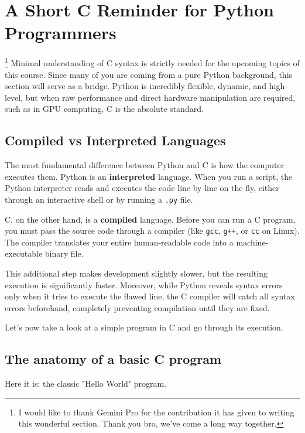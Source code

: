 \section{A Short C Reminder for Python Programmers}

\footnote{I would like to thank Gemini Pro for the contribution it has given to writing this wonderful section. Thank you bro, we've come a long way together.} Minimal understanding of C syntax is strictly needed for the upcoming topics of this course. Since many of you are coming from a pure Python background, this section will serve as a bridge. Python is incredibly flexible, dynamic, and high-level, but when raw performance and direct hardware manipulation are required, such as in GPU computing, C is the absolute standard.

\subsection{Compiled vs Interpreted Languages}

The most fundamental difference between Python and C is how the computer executes them. Python is an \textbf{interpreted} language. When you run a script, the Python interpreter reads and executes the code line by line on the fly, either through an interactive shell or by running a \texttt{.py} file. 

C, on the other hand, is a \textbf{compiled} language. Before you can run a C program, you must pass the source code through a compiler (like \texttt{gcc}, \texttt{g++}, or \texttt{cc} on Linux). The compiler translates your entire human-readable code into a machine-executable binary file. 

This additional step makes development slightly slower, but the resulting execution is significantly faster. Moreover, while Python reveals syntax errors only when it tries to execute the flawed line, the C compiler will catch all syntax errors beforehand, completely preventing compilation until they are fixed.

Let's now take a look at a simple program in C and go through  its execution.

\subsection{The anatomy of a basic C program}

Here it is: the classic "Hello World" program. 



